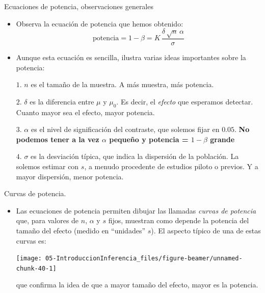 \documentclass[
  9pt,
  ignorenonframetext,
]{beamer}
\begin{document}
\begin{frame}{Ecuaciones de potencia, observaciones generales}
\protect\hypertarget{ecuaciones-de-potencia-observaciones-generales}{}

\begin{itemize}
\item
  Observa la ecuación de potencia que hemos obtenido: \[
  \text{potencia} = 1 - \beta = K\, \dfrac{\delta\,\sqrt{n}\,\alpha}{\sigma}
  \]
\item
  Aunque esta ecuación es sencilla, ilustra varias ideas importantes
  sobre la potencia:

  \(1\). \(n\) es el tamaño de la muestra. A más muestra, más potencia.

  \(2\). \(\delta\) es la diferencia entre \(\mu\) y \(\mu_0\). Es
  decir, el \emph{efecto} que esperamos detectar. Cuanto mayor sea el
  efecto, mayor potencia.

  \(3\). \(\alpha\) es el nivel de significación del contraste, que
  solemos fijar en \(0.05\). \textbf{No podemos tener a la vez
  \(\alpha\) pequeño y potencia = \(1 - \beta\) grande}

  \(4.\) \(\sigma\) es la desviación típica, que indica la dispersión de
  la población. La solemos estimar con \(s\), a menudo procedente de
  estudios piloto o previos. Y a mayor dispersión, menor potencia.
\end{itemize}

\end{frame}

\begin{frame}{Curvas de potencia.}
\protect\hypertarget{curvas-de-potencia.}{}

\begin{itemize}
\item
  Las ecuaciones de potencia permiten dibujar las llamadas \emph{curvas
  de potencia} que, para valores de \(n\), \(\alpha\) y \(s\) fijos,
  muestran como depende la potencia del tamaño del efecto (medido en
  ``unidades'' \(s\)). El aspecto típico de una de estas curvas es:

  \begin{center}\texttt{[image: 05-IntroduccionInferencia\_files/figure-beamer/unnamed-chunk-40-1]} \end{center}

  que confirma la idea de que a mayor tamaño del efecto, mayor es la
  potencia.
\end{itemize}

\end{frame}
\end{document}
